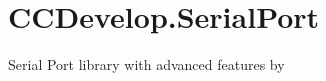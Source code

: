 \chapter{CCDevelop.\+Serial\+Port}
\hypertarget{md_README}{}\label{md_README}
\label{md_README_autotoc_md0}%
%


Serial Port library with advanced features by  